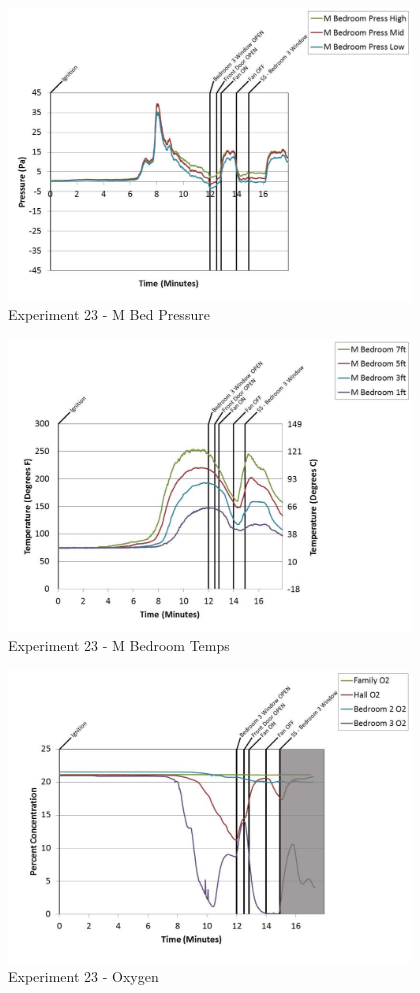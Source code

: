 \documentclass{article}
\begin{document}
\begin{appendices}
	\clearpage

	\begin{figure}[h!]
		\centering
		\includegraphics[height=3.05in]{0_Images/Results_Charts/Exp_23_Charts/MBedPressure.pdf}
		\caption{Experiment 23 - M Bed Pressure}
	\end{figure}
 

	\begin{figure}[h!]
		\centering
		\includegraphics[height=3.05in]{0_Images/Results_Charts/Exp_23_Charts/MBedroomTemps.pdf}
		\caption{Experiment 23 - M Bedroom Temps}
	\end{figure}
 
	\clearpage

	\begin{figure}[h!]
		\centering
		\includegraphics[height=3.05in]{0_Images/Results_Charts/Exp_23_Charts/Oxygen.pdf}
		\caption{Experiment 23 - Oxygen}
	\end{figure}
 


\end{appendices}
\end{document}
